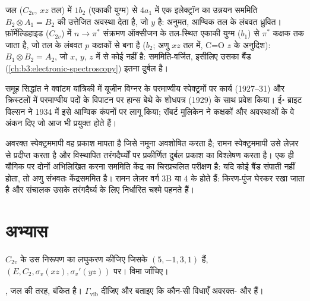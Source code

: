 \begin{example}[जल और फ़ॉर्मेल्डिहाइड के संक्रमण]\label{ex:b3:group-theory-applied:electronic}
जल ($C_{2v}$, $xz$ तल) में $1b_2$ (एकाकी युग्म) से
$4a_1$ में एक इलेक्ट्रॉन का उन्नयन सममिति $B_2\otimes A_1 = B_2$ की उत्तेजित अवस्था देता है, जो $y$ है:
अनुमत, आण्विक तल के लंबवत ध्रुवित। फ़ॉर्मेल्डिहाइड
($C_{2v}$) में $n\to\pi^*$ संक्रमण ऑक्सीजन के तल-स्थित एकाकी युग्म ($b_1$) से
$\pi^*$ कक्षक तक जाता है, जो तल के लंबवत $p$ कक्षकों से बना है
($b_2$; अणु $xz$ तल में, C=O $z$ के अनुदिश): $B_1\otimes B_2 = A_2$,
जो $x$, $y$, $z$ में से कोई नहीं है: सममिति-वर्जित, इसीलिए उसका बैंड
(\cref{ch:b3:electronic-spectroscopy}) इतना दुर्बल है।
\end{example}

\begin{history}[विग्नर, बेथे और अणुओं की सममिति]
समूह सिद्धांत ने क्वांटम यांत्रिकी में यूजीन विग्नर के परमाण्वीय
स्पेक्ट्रमों पर कार्य (1927--31) और क्रिस्टलों में परमाण्वीय पदों के विपाटन पर हान्स
बेथे के शोधपत्र (1929) के साथ प्रवेश किया। ई॰ ब्राइट विल्सन ने 1934 में इसे आण्विक कंपनों पर
लागू किया; रॉबर्ट मुलिकेन ने कक्षकों और अवस्थाओं के वे अंकन दिए जो आज भी प्रयुक्त होते हैं।
\end{history}

\begin{inthelab}[अवरक्त और रामन साथ-साथ]
अवरक्त स्पेक्ट्रममापी वह प्रकाश मापता है जिसे नमूना अवशोषित करता है; रामन
स्पेक्ट्रममापी उसे लेज़र से प्रदीप्त करता है और विस्थापित तरंगदैर्घ्यों पर
प्रकीर्णित दुर्बल प्रकाश का विश्लेषण करता है। एक ही यौगिक पर दोनों अभिलिखित करना
सममिति केंद्र का चिरप्रचलित परीक्षण है: यदि कोई बैंड संपाती नहीं होता, तो अणु
संभवतः केंद्रसममित है। रामन लेज़र वर्ग 3B या 4 के होते हैं: किरण-पुंज
घेरकर रखा जाता है और संचालक उसके तरंगदैर्घ्य के लिए निर्धारित चश्मे पहनते हैं।
\end{inthelab}

\section{अभ्यास}

\begin{exercise}[$\star$]\label{exo:b3:group-theory-applied:1}
$C_{2v}$ के उस निरूपण का लघुकरण कीजिए जिसके  $(5, -1, 3, 1)$ हैं, $(E, C_2,
\sigma_v(xz), \sigma_v'(yz))$ पर। विमा जाँचिए।
\end{exercise}

\begin{exercise}[$\star$]\label{exo:b3:group-theory-applied:2}
, जल की तरह, बंकित है। $\Gamma_{\mathrm{vib}}$ दीजिए और बताइए कि कौन-सी विधाएँ अवरक्त-
और  हैं।
\end{exercise}

